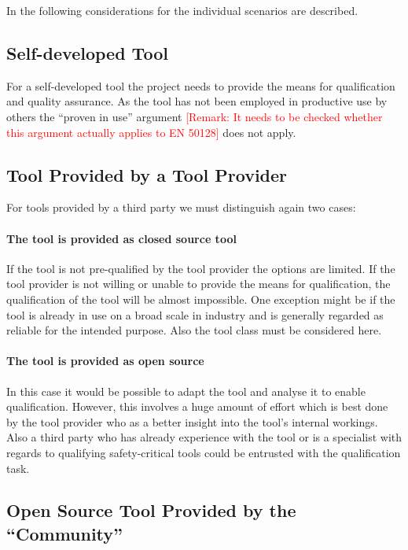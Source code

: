 In the following considerations for the individual scenarios are described.

\subsection{Self-developed Tool}

For a self-developed tool the project needs to provide the means for qualification and quality assurance. As the tool has not been employed in productive use by others the ``proven in use'' argument \textcolor{red}{[Remark: It needs to be checked whether this argument actually applies to EN 50128]} does not apply.

\subsection{Tool Provided by a Tool Provider}

For tools provided by a third party we must distinguish again two cases:

\paragraph{The tool is provided as closed source tool}

If the tool is not pre-qualified by the tool provider the options are limited. If the tool provider is not willing or unable to provide the means for qualification, the qualification of the tool will be almost impossible. One exception might be if the tool is already in use on a broad scale in industry and is generally regarded as reliable for the intended purpose. Also the tool class must be considered here.

\paragraph{The tool is provided as open source}

In this case it would be possible to adapt the tool and analyse it to enable qualification. However, this involves a huge amount of effort which is best done by the tool provider who as a better insight into the tool's internal workings. Also a third party who has already experience with the tool or is a specialist with regards to qualifying safety-critical tools could be entrusted with the qualification task.

\subsection{Open Source Tool Provided by the ``Community''}

